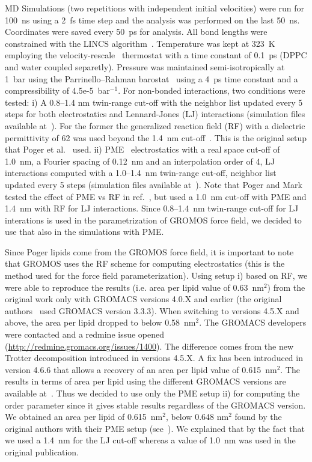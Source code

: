 \documentclass[journal=jacsat,manuscript=article]{achemso}
\begin{document}
MD Simulations (two repetitions with independent initial velocities) were run for 100~ns using a 2~fs time step and the analysis 
was performed on the last 50~ns. Coordinates were saved every 50~ps for analysis. All bond lengths were constrained with the LINCS algorithm~\cite{hess97,hess07}. Temperature was kept 
at 323~K employing the velocity-rescale~\cite{bussi07} thermostat with a time constant of 0.1~ps (DPPC and water coupled separetly). Pressure was maintained semi-isotropically at 1~bar using 
the Parrinello--Rahman barostat~\cite{parrinello81} using a 4~ps time constant and a compressibility of 4.5e-5~bar$^{-1}$. For non-bonded interactions, two conditions were tested:
i) A 0.8--1.4 nm twin-range cut-off with the neighbor list updated every 5 steps for both electrostatics and Lennard-Jones (LJ) interactions 
(simulation files available at~\cite{pogerFILESrf1,pogerFILESrf2}). For the former the generalized reaction 
field (RF) with a dielectric permittivity of 62 was used beyond the 1.4~nm cut-off~\cite{tironi95}. This is the original setup that Poger et al.~\cite{poger10} used.
ii) PME~\cite{darden93,essman95} electrostatics with a real space cut-off of 1.0~nm, a Fourier spacing of 0.12~nm and an interpolation order of 4, LJ interactions computed with a 1.0--1.4~nm twin-range cut-off,
neighbor list updated every 5 steps (simulation files available at~\cite{pogerFILESpme1,pogerFILESpme2}). 
Note that Poger and Mark tested the effect of PME vs RF in ref.~\cite{poger12}, but used a 1.0~nm cut-off with PME and 1.4~nm with RF for LJ
interactions. Since 0.8--1.4~nm twin-range cut-off for LJ interations is used in the parametrization of GROMOS force field, we decided to use that
also in the simulations with PME.

Since Poger lipids come from the GROMOS force field, it is important to note that GROMOS uses the RF scheme for computing electrostatics (this is the method used for the 
force field parameterization). Using setup i) based on RF, we were able to reproduce the results (i.e. area per lipid value of 0.63~nm$^2$) from the original work only with 
GROMACS versions 4.0.X and earlier (the original authors~\cite{poger10} used GROMACS version 3.3.3). When switching to versions 4.5.X and above, the area per lipid dropped to below 0.58~nm$^2$. 
The GROMACS developers were contacted and a redmine issue opened (\url{http://redmine.gromacs.org/issues/1400}). The difference comes from the new Trotter decomposition 
introduced in versions 4.5.X. A fix has been introduced in version 4.6.6 that allows a recovery of an area per lipid value of 0.615~nm$^2$. The results in terms of area per lipid using the different 
GROMACS versions are available at~\cite{pogerFILESrf2}.
Thus we decided to use only the PME setup ii) for computing the order parameter since it gives stable results regardless of the GROMACS version. We obtained an area per 
lipid of 0.615~nm$^2$, below 0.648 nm$^2$ found by the original authors with their PME setup (see~\cite{poger12}). We explained that by the fact that we used 
a 1.4~nm for the LJ cut-off whereas a value of 1.0~nm was used in the original publication. 
\end{document}

